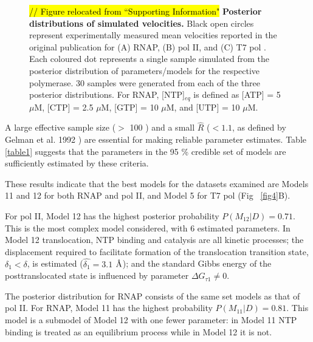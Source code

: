 \documentclass[10pt,letterpaper]{article}
\newcommand{\angstrom}{\mbox{\normalfont\AA}}
\begin{document}
\begin{figure}[!h]
\caption{\textcolor{red}{\hl{// Figure relocated from ``Supporting Information"}} \textbf{Posterior distributions of simulated velocities.} Black open circles represent experimentally measured mean velocities reported in the original publication for (A) RNAP,  (B) pol II, and (C) T7 pol \cite{abbondanzieri2005direct,schweikhard2014transcription,thomen2008t7}. Each coloured dot represents a single sample simulated from the posterior distribution of parameters/models for the respective polymerase. 30 samples were generated from each of the three posterior distributions. For RNAP, [NTP]$_{eq}$ is defined as [ATP] = 5 $\mu$M, [CTP] = 2.5 $\mu$M, [GTP] = 10 $\mu$M, and [UTP] = 10 $\mu$M. }
\label{fig6}
\end{figure}









A large effective sample size ($>$ 100 \cite{rambaut2013tracer}) and a small $\hat{R}$ ($< 1.1$, as defined by Gelman et al. 1992  \cite{gelman1992inference, brooks2011handbook, brooks1998general}) are essential for making reliable parameter estimates. Table \ref{table1} suggests that the parameters in the 95 \% credible set of models are sufficiently estimated by these criteria.





These results indicate that the best models for the datasets examined are Models 11 and 12 for both RNAP and pol II, and Model 5 for T7 pol (Fig ~\ref{fig4}B).



For  pol II, Model 12 has the highest posterior probability $P(M_{12}|D) = 0.71$. This is the most complex model considered, with 6 estimated parameters. In Model 12 translocation, NTP binding and catalysis are all kinetic processes; the displacement required to facilitate formation of the translocation transition state, $\delta_1 < \delta$, is estimated ($\hat{\delta_1} = 3.1$ $\angstrom$); and the standard Gibbs energy of the posttranslocated state is influenced by parameter $\Delta G_{\tau 1} \neq 0$. \par

The posterior distribution for  RNAP  consists of the same set models as that of pol II. For RNAP, Model 11 has the highest probability $P(M_{11}|D) = 0.81$. This model is a submodel of Model 12 with one fewer parameter: in Model 11 NTP binding is treated as an equilibrium process while in Model 12 it is not. \par
\end{document}
